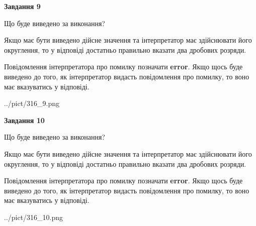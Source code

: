 \documentclass[12pt, ukrainian]{article}
\begin{document}
{\begin {Large}
{\begin {center}\textbf{Завдання 9}\end {center}}\par
Що буде виведено за виконання? \par

Якщо має бути виведено дійсне значення та інтерпретатор має здійснювати його округлення, 
то у відповіді достатньо правильно вказати два дробових розряди.

Повідомлення інтерпретатора про помилку позначати \textbf{error}.
Якщо щось буде виведено до того, як інтерпретатор видасть повідомлення про помилку, 
то воно має вказуватись у відповіді. \par

\begin{center}
	{../pict/316_9.png}
\end{center}
\newpage

{\begin {center}\textbf{Завдання 10}\end {center}}\par
Що буде виведено за виконання? \par

Якщо має бути виведено дійсне значення та інтерпретатор має здійснювати його округлення, 
то у відповіді достатньо правильно вказати два дробових розряди.

Повідомлення інтерпретатора про помилку позначати \textbf{error}.
Якщо щось буде виведено до того, як інтерпретатор видасть повідомлення про помилку, 
то воно має вказуватись у відповіді. \par

\begin{center}
	{../pict/316_10.png}
\end{center}
\newpage

\end {Large}}
\end{document}
